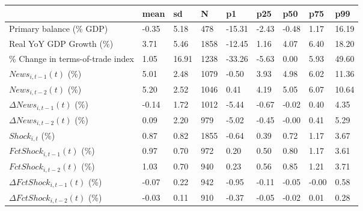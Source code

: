 \begin{table}[htbp]
\begin{tabular}{|l|l|l|l|l|l|l|l|l|}\hline  
 & mean  & sd  & N  & p1  & p25  & p50  & p75  & p99  \\ \hline  
Primary balance (\% GDP) &     -0.35 &      5.18 &       478 &    -15.31 &     -2.43 &     -0.48 &      1.17 &     16.19 \\ \hline 
Real YoY GDP Growth (\%) &      3.71 &      5.46 &      1858 &    -12.45 &      1.16 &      4.07 &      6.40 &     18.20 \\ \hline 
\% Change in terms-of-trade index &      1.05 &     16.91 &      1238 &    -33.26 &     -5.63 &      0.00 &      5.93 &     49.60 \\ \hline 
$ News_{i,t-1}(t)$ (\%) &      5.01 &      2.48 &      1079 &     -0.50 &      3.93 &      4.98 &      6.02 &     11.36 \\ \hline 
$ News_{i,t-2}(t)$ (\%) &      5.20 &      2.52 &      1046 &      0.41 &      4.19 &      5.05 &      6.07 &     10.64 \\ \hline 
$ \Delta News_{i,t-1}(t)$ (\%) &     -0.14 &      1.72 &      1012 &     -5.44 &     -0.67 &     -0.02 &      0.40 &      4.35 \\ \hline 
$ \Delta News_{i,t-2}(t)$ (\%) &      0.09 &      2.20 &       979 &     -5.02 &     -0.45 &     -0.00 &      0.41 &      5.29 \\ \hline 
$ Shock_{i,t}$ (\%) &      0.87 &      0.82 &      1855 &     -0.64 &      0.39 &      0.72 &      1.17 &      3.67 \\ \hline 
$ FctShock_{i,t-1}(t)$ (\%) &      0.97 &      0.70 &       972 &      0.20 &      0.50 &      0.80 &      1.17 &      3.61 \\ \hline 
$ FctShock_{i,t-2}(t)$ (\%) &      1.03 &      0.70 &       940 &      0.23 &      0.56 &      0.85 &      1.21 &      3.71 \\ \hline 
$ \Delta FctShock_{i,t-1}(t)$ (\%) &     -0.07 &      0.22 &       942 &     -0.95 &     -0.11 &     -0.05 &     -0.00 &      0.58 \\ \hline 
$ \Delta FctShock_{i,t-2}(t)$ (\%) &     -0.03 &      0.11 &       910 &     -0.37 &     -0.05 &     -0.02 &      0.01 &      0.28 \\ \hline 
  \end{tabular}
\end{table}
